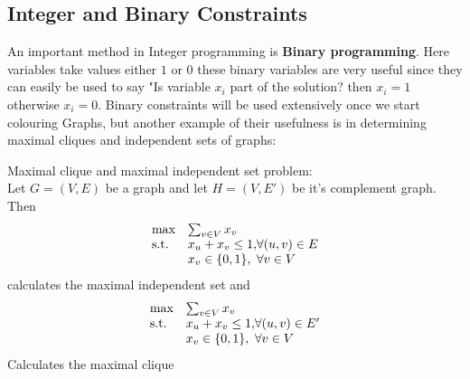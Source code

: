 \subsection{Integer and Binary Constraints}
An important method in Integer programming is \textbf{Binary programming}. Here variables take values either $1$ or $0$ these binary variables are very useful since they can easily be used to say "Is variable $x_i$ part of the solution? then $x_i = 1$ otherwise $x_i = 0$. Binary constraints will be used extensively once we start colouring Graphs, but another example of their usefulness is in determining maximal cliques and independent sets of graphs:
\begin{example}\label{clique}
Maximal clique and maximal independent set problem:\\
Let $G=(V,E)$ be a graph and let $H=(V,E')$ be it's complement graph. Then
\begin{align}
\begin{array}{ll@{}ll}
\text{max} &\sum_{v\in V} x_v&\\
\text{s.t.} &x_u + x_v \leq 1,& \forall (u,v) \in E\\
&x_v\in\{0,1\},& \forall v \in V\\
\end{array}
\end{align}
calculates the maximal independent set and
\begin{align}
\begin{array}{ll@{}ll}
\text{max} &\sum_{v\in V} x_v&\\
\text{s.t.} &x_u + x_v \leq 1,& \forall (u,v) \in E'\\
&x_v\in\{0,1\},& \forall v \in V\\
\end{array}
\end{align}
Calculates the maximal clique
\begin{figure}[H]
\centering
{}
\end{figure}
\end{example}
